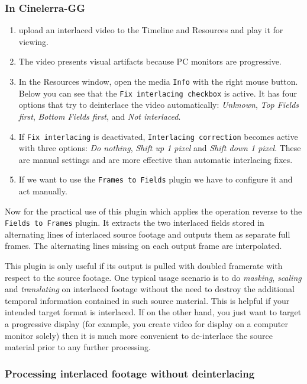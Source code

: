 \subsubsection*{In Cinelerra-GG}
\label{ssub:in_cin_gg}

\begin{enumerate}
    \item upload an interlaced video to the Timeline and Resources and play it for viewing.
    \item The video presents visual artifacts because PC monitors are progressive.
    \item In the Resources window, open the media \texttt{Info} with the right mouse button. Below you can see that the \texttt{Fix interlacing checkbox} is active. It has four options that try to deinterlace the video automatically: \textit{Unknown}, \textit{Top Fields first}, \textit{Bottom Fields first}, and \textit{Not interlaced}.
    \item If \texttt{Fix interlacing} is deactivated, \texttt{Interlacing correction} becomes active with three options: \textit{Do
    nothing}, \textit{Shift up 1 pixel} and \textit{Shift down 1 pixel}. These are manual settings and are more effective
    than automatic interlacing fixes.
    \item If we want to use the \texttt{Frames to Fields} plugin we have to configure it and act manually.
\end{enumerate}

Now for the practical use of this plugin which applies the operation reverse to the \texttt{Fields to Frames} plugin. It extracts the two interlaced fields stored in alternating lines of interlaced source footage and outputs them as separate full frames. The alternating lines missing on each output frame are interpolated.

This plugin is only useful if its output is pulled with doubled framerate with respect to the source footage. One typical usage scenario is to do \textit{masking}, \textit{scaling} and \textit{translating} on interlaced footage without the need to destroy the additional temporal information contained in such source material. This is helpful if your intended target format is interlaced. If on the other hand, you just want to target a progressive display (for example, you create video for display on a computer monitor solely) then it is much more convenient to de-interlace the source material prior to any further processing.

\subsubsection*{Processing interlaced footage without deinterlacing}
\label{ssub:processing_interlace_footage}

